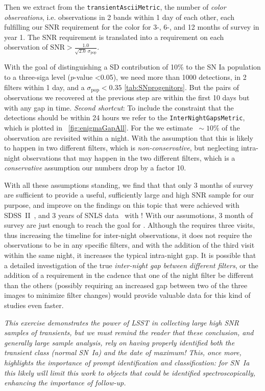 Then we extract from the \texttt{transientAsciiMetric}, the number of
\emph{color observations}, i.e. observations in 2 bands within 1 day
of each other, each fulfilling our SNR requirement for the color for
3-, 6-, and 12 months of survey in year 1. The SNR requirement is
translated into a requirement on each
observation of $\mathrm{SNR} >
\frac{1.0}{\sqrt{2.0}~\sigma_\mathrm{pop}}$.

With the goal of distinguishing a SD contribution of 10\% to the SN Ia
population to a three-siga level ($p$-value <0.05), we need more than
1000 detections, in 2 filters within 1 day, and a
$\sigma_\mathrm{pop}<0.35$ \autoref{tab:SNprogenitors}. But the pairs
of observations we recovered at the previous step are within the first
10 days but with any gap in time. \emph{Second shortcut}: To include
the constraint that the detections should be within 24 hours we refer
to the \texttt{InterNightGapsMetric}, which is plotted in
~\autoref{fig:enigmaGapAll}.  For the  we
estimate $~\sim10\%$ of the observation are revisited within a
night. With the assumption that this is likely to happen in two
different filters, which is \emph{non-conservative}, but neglecting
intra-night observations that may happen in the two different filters,
which is a \emph{conservative} assumption our numbers drop by a factor
10.

With all these assumptions standing, we find that
 that only 3  months of survey are sufficient to provide a useful,
sufficiently large and high SNR sample for our purpose, and improve on
the findings on this topic that were achieved with SDSS~II~\citep{Hayden2010}, and 3 years
of SNLS data~\citep{Bianco11} with ! With our assumotions, 3 month of survey are just enough to reach the goal for
. Although the  requires three visits, thus increasing the timeline for inter-night observations, it does not require the observations to be in any specific filters, and with the addition of the third visit within the same night, it increases the typical intra-night gap. It is possible that a detailed investigation of the true \emph{inter-night gap between different filters}, or the addition of a requirement in the cadence that one of the night filter be different than the others (possibly requiring an increased gap between two of the three images to minimize filter changes) would provide valuable data for this kind of studies even faster.

\emph{This exercise demonstrates the power of LSST in collecting large high SNR samples of transients, but we must remind the reader that these conclusion, and generally large sample analysis, rely on having properly identified both the transient class (normal SN~Ia) and the date of maximum! This, once more, highlights the importance of prompt identification and classification: for SN~Ia this likely will limit this work to objects that could be identified spectroscopically, enhancing the importance of follow-up.}


